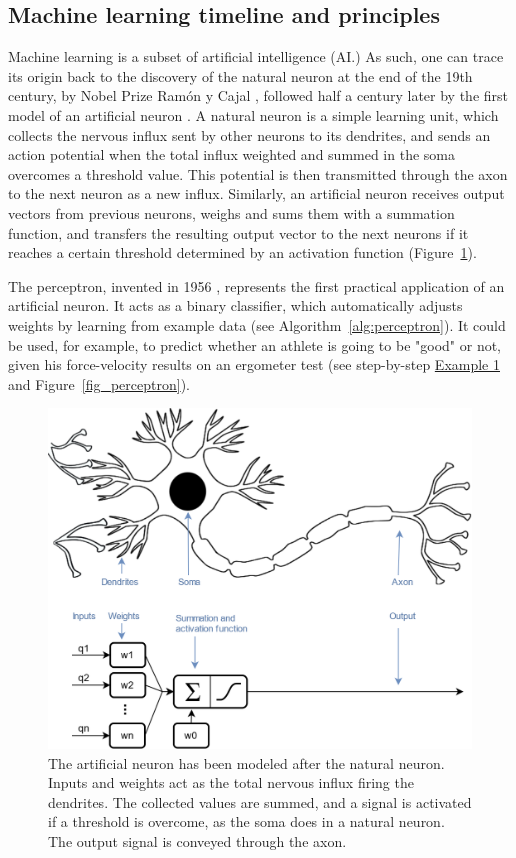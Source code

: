 \subsection{Machine learning timeline and principles}

Machine learning is a subset of artificial intelligence (AI.) As such, one can trace its origin back to the discovery of the natural neuron at the end of the 19th century, by Nobel Prize Ramón y Cajal \cite{Lopez2006}, followed half a century later by the first model of an artificial neuron \cite{Mcculloch1943}. A natural neuron is a simple learning unit, which collects the nervous influx sent by other neurons to its dendrites, and sends an action potential when the total influx weighted and summed in the soma overcomes a threshold value. This potential is then transmitted through the axon to the next neuron as a new influx. Similarly, an artificial neuron receives output vectors from previous neurons, weighs and sums them with a summation function, and transfers the resulting output vector to the next neurons if it reaches a certain threshold determined by an activation function (Figure~\ref{fig_neuron}). 

The perceptron, invented in 1956 \cite{Rosenblatt1958}, represents the first practical application of an artificial neuron. It acts as a binary classifier, which automatically adjusts weights by learning from example data (see Algorithm~\ref{alg:perceptron}). It could be used, for example, to predict whether an athlete is going to be "good" or not, given his force-velocity results on an ergometer test (see step-by-step \hyperlink{example1}{Example 1} and Figure~\ref{fig_perceptron}). 

\begin{figure}[hbtp]
	\centering
	\def\svgwidth{1\columnwidth}
	\fontsize{10pt}{10pt}\selectfont
	\includegraphics[width=\linewidth]{"../Chap2/Figures/Fig_neuron.png"}
	\caption{The artificial neuron has been modeled after the natural neuron. Inputs and weights act as the total nervous influx firing the dendrites. The collected values are summed, and a signal is activated if a threshold is overcome, as the soma does in a natural neuron. The output signal is conveyed through the axon.}
	\label{fig_neuron}
\end{figure}


